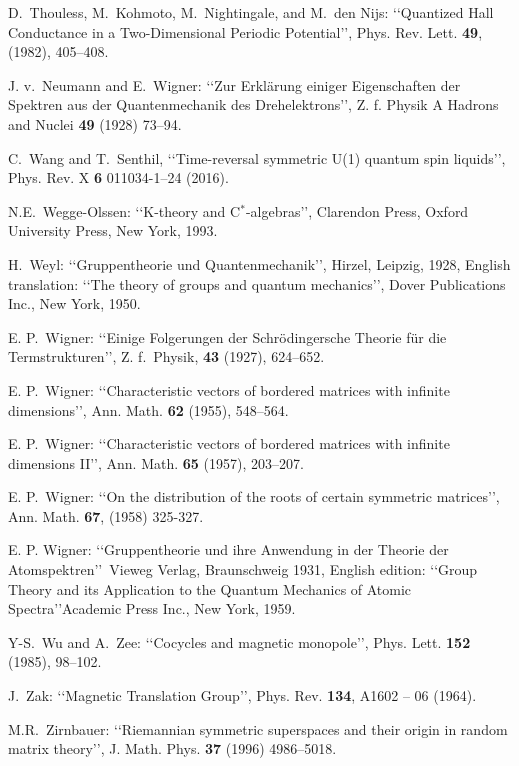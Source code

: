 \documentclass[11pt]{article}
\begin{document}
\begin{thebibliography}{99}
D.\ Thouless, M.\  Kohmoto, M.\  Nightingale, and M.\ den Nijs: \lq\lq Quantized Hall Conductance in a Two-Dimensional
Periodic Potential\rq\rq,  Phys. Rev. Lett. {\bf 49}, (1982), 405--408.

  J. v.\  Neumann and E.\  Wigner: \lq\lq  Zur Erkl\"arung einiger Eigenschaften der Spektren aus der Quantenmechanik
des Drehelektrons\rq\rq, Z. f. Physik A Hadrons and Nuclei {\bf 49} (1928) 73--94.

C.\ Wang and T.\ Senthil, 
\lq\lq Time-reversal symmetric U(1) quantum spin liquids\rq\rq, Phys. Rev. X {\bf 6} 011034-1--24 (2016).

N.E.\ Wegge-Olssen: \lq\lq K-theory and C$^*$-algebras\rq\rq, Clarendon Press, Oxford University Press, New York, 1993.

H.\ Weyl: \lq\lq Gruppentheorie und Quantenmechanik\rq\rq,  Hirzel, Leipzig, 1928,
English translation: \lq\lq The theory of groups and quantum mechanics\rq\rq, Dover Publications Inc., New York, 1950.

E. P.\  Wigner: \lq\lq Einige Folgerungen der Schr\"odingersche Theorie f\"ur die Termstrukturen\rq\rq, Z. f.\  Physik, {\bf 43} (1927), 624--652.

E. P.\  Wigner:
\lq\lq Characteristic vectors of bordered matrices with infinite dimensions\rq\rq,  Ann. Math. {\bf 62} (1955), 548--564.

E. P.\ Wigner: \lq\lq Characteristic vectors of bordered matrices with infinite dimensions II\rq\rq,  Ann. Math.  {\bf 65} (1957), 203--207. 

E. P.\  Wigner: \lq\lq On the distribution of the roots of certain symmetric matrices\rq\rq,  Ann. Math. {\bf 67}, (1958) 325-327.

E. P. Wigner: \lq\lq Gruppentheorie und ihre Anwendung in der Theorie der Atomspektren\rq\rq\ Vieweg Verlag, Braunschweig 1931,
English edition: \lq\lq Group Theory and its Application to the Quantum Mechanics of Atomic
Spectra\rq\rq Academic Press Inc., New York, 1959.

Y-S.\ Wu and A.\ Zee: \lq\lq Cocycles and magnetic monopole\rq\rq, Phys. Lett. {\bf 152} (1985), 98--102.


J.\  Zak: \lq\lq Magnetic Translation Group\rq\rq, Phys. Rev. {\bf 134},  A1602 – 06 (1964).

M.R.\  Zirnbauer: \lq\lq Riemannian symmetric superspaces and their origin in random matrix theory\rq\rq,
J. Math. Phys. {\bf 37} (1996) 4986--5018.


\end{thebibliography}
\end{document}
